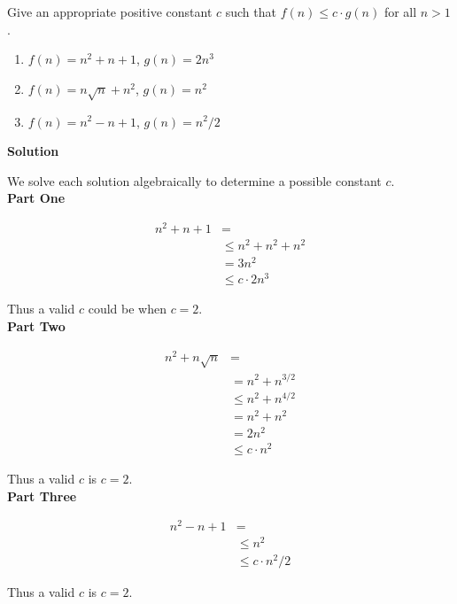 \begin{homeworkProblem}
  Give an appropriate positive constant \(c\) such that \(f(n) \leq c \cdot
  g(n)\) for all \(n > 1\).

  \begin{enumerate}
      \item \(f(n) = n^2 + n + 1\), \(g(n) = 2n^3\)
      \item \(f(n) = n\sqrt{n} + n^2\), \(g(n) = n^2\)
      \item \(f(n) = n^2 - n + 1\), \(g(n) = n^2 / 2\)
  \end{enumerate}

  \textbf{Solution}

  We solve each solution algebraically to determine a possible constant
  \(c\).
  \\

  \textbf{Part One}

  \[
      \begin{split}
          n^2 + n + 1 &=
          \\
          &\leq n^2 + n^2 + n^2
          \\
          &= 3n^2
          \\
          &\leq c \cdot 2n^3
      \end{split}
  \]

  Thus a valid \(c\) could be when \(c = 2\).
  \\

  \textbf{Part Two}

  \[
      \begin{split}
          n^2 + n\sqrt{n} &=
          \\
          &= n^2 + n^{3/2}
          \\
          &\leq n^2 + n^{4/2}
          \\
          &= n^2 + n^2
          \\
          &= 2n^2
          \\
          &\leq c \cdot n^2
      \end{split}
  \]

  Thus a valid \(c\) is \(c = 2\).
  \\

  \textbf{Part Three}

  \[
      \begin{split}
          n^2 - n + 1 &=
          \\
          &\leq n^2
          \\
          &\leq c \cdot n^2/2
      \end{split}
  \]

  Thus a valid \(c\) is \(c = 2\).

\end{homeworkProblem}